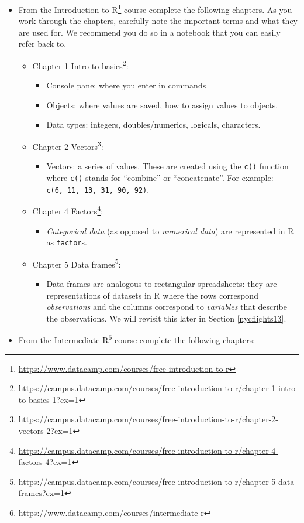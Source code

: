 \documentclass[12pt, krantz2,]{krantz}
\providecommand{\tightlist}{%
  \setlength{\itemsep}{0pt}\setlength{\parskip}{0pt}}
\renewcommand{\href}[2]{#2\footnote{\url{#1}}}
\begin{document}
\begin{itemize}
\tightlist
\item
  From the \href{https://www.datacamp.com/courses/free-introduction-to-r}{Introduction to R} course complete the following chapters. As you work through the chapters, carefully note the important terms and what they are used for. We recommend you do so in a notebook that you can easily refer back to.

  \begin{itemize}
  \tightlist
  \item
    \href{https://campus.datacamp.com/courses/free-introduction-to-r/chapter-1-intro-to-basics-1?ex=1}{Chapter 1 Intro to basics}:

    \begin{itemize}
    \tightlist
    \item
      Console pane: where you enter in commands
    \item
      Objects: where values are saved, how to assign values to objects.
    \item
      Data types: integers, doubles/numerics, logicals, characters.\\
    \end{itemize}
  \item
    \href{https://campus.datacamp.com/courses/free-introduction-to-r/chapter-2-vectors-2?ex=1}{Chapter 2 Vectors}:

    \begin{itemize}
    \tightlist
    \item
      Vectors: a series of values. These are created using the \texttt{c()} function where \texttt{c()} stands for ``combine'' or ``concatenate''. For example: \texttt{c(6,\ 11,\ 13,\ 31,\ 90,\ 92)}.
    \end{itemize}
  \item
    \href{https://campus.datacamp.com/courses/free-introduction-to-r/chapter-4-factors-4?ex=1}{Chapter 4 Factors}:

    \begin{itemize}
    \tightlist
    \item
      \emph{Categorical data} (as opposed to \emph{numerical data}) are represented in R as \texttt{factor}s.
    \end{itemize}
  \item
    \href{https://campus.datacamp.com/courses/free-introduction-to-r/chapter-5-data-frames?ex=1}{Chapter 5 Data frames}:

    \begin{itemize}
    \tightlist
    \item
      Data frames are analogous to rectangular spreadsheets: they are representations of datasets in R where the rows correspond \emph{observations} and the columns correspond to \emph{variables} that describe the observations. We will revisit this later in Section \ref{nycflights13}.
    \end{itemize}
  \end{itemize}
\item
  From the \href{https://www.datacamp.com/courses/intermediate-r}{Intermediate R} course complete the following chapters:


\end{itemize}
\end{document}
